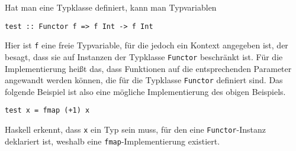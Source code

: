 Hat man eine Typklasse definiert, kann man Typvariablen 

\begin{verbatim}
test :: Functor f => f Int -> f Int
\end{verbatim}

Hier ist \texttt{f} eine freie Typvariable, für die jedoch ein Kontext angegeben ist, der besagt, dass sie auf Instanzen
der Typklasse \texttt{Functor} beschränkt ist. Für die Implementierung heißt das, dass Funktionen auf die entsprechenden
Parameter angewandt werden können, die für die Typklasse \texttt{Functor} definiert sind. Das folgende Beispiel ist also
eine mögliche Implementierung des obigen Beispiels.

\begin{verbatim}
test x = fmap (+1) x
\end{verbatim}

Haskell erkennt, dass \texttt{x} ein Typ sein muss, für den eine \texttt{Functor}-Instanz deklariert ist, weshalb eine
\texttt{fmap}-Implementierung existiert.